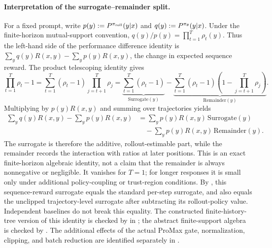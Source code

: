 \paragraph{Interpretation of the surrogate--remainder split.}
For a fixed prompt, write $p(y):=P^{\pi_{\mathrm{roll}}}(y|x)$ and
$q(y):=P^{\pi_{\theta}}(y|x)$. Under the finite-horizon mutual-support convention,
$q(y)/p(y)=\prod_{t=1}^{T}\rho_t(y)$. Thus the left-hand side of the performance
difference identity is
$\sum_y q(y)R(x,y)-\sum_y p(y)R(x,y)$, the change in expected sequence reward.
The product telescoping identity gives
\begin{equation*}
    \prod_{t=1}^{T}\rho_t-1
    = \sum_{t=1}^{T}(\rho_t-1)\prod_{j=t+1}^{T}\rho_j
    = \underbrace{\sum_{t=1}^{T}(\rho_t-1)}_{\mathrm{Surrogate}(y)}
      -\underbrace{\sum_{t=1}^{T}(\rho_t-1)
        \left(1-\prod_{j=t+1}^{T}\rho_j\right)}_{\mathrm{Remainder}(y)}.
\end{equation*}
Multiplying by $p(y)R(x,y)$ and summing over trajectories yields
\begin{equation*}
    \begin{aligned}
    \sum_y q(y)R(x,y)-\sum_y p(y)R(x,y)
    &= \sum_y p(y)R(x,y)\,\mathrm{Surrogate}(y)\\
    &\quad-\sum_y p(y)R(x,y)\,\mathrm{Remainder}(y).
    \end{aligned}
\end{equation*}
The surrogate is therefore the additive, rollout-estimable part, while the
remainder records the interaction with ratios at later positions. This is an
exact finite-horizon algebraic identity, not a claim that the remainder is
always nonnegative or negligible. It vanishes for $T=1$; for longer responses
it is small only under additional policy-coupling or trust-region conditions.
By , this sequence-reward surrogate equals the standard per-step surrogate, and also equals the
unclipped trajectory-level surrogate after subtracting its rollout-policy value. Independent baselines do not break this equality.
The constructed finite-history-tree version of this identity is checked by
 in
; the abstract finite-support algebra is checked by
. The additional effects of the actual ProMax gate, normalization, clipping, and batch reduction are identified separately in
.

